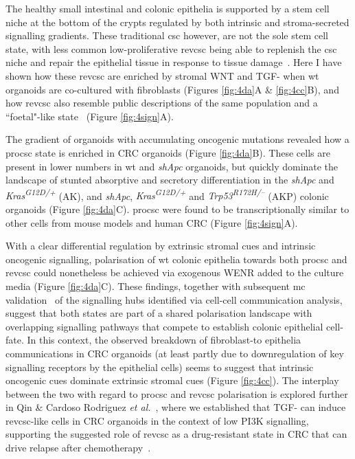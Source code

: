 The healthy small intestinal and colonic epithelia is supported by a stem cell niche at the bottom of the crypts regulated by both intrinsic and stroma-secreted signalling gradients. These traditional \acrfull{csc} however, are not the sole stem cell state, with less common low-proliferative \acrfull{revcsc} being able to replenish the \acrshort{csc} niche and repair the epithelial tissue in response to tissue damage~\cite{ayyaz_single-cell_2019}. Here I have shown how these \acrshort{revcsc} are enriched by stromal WNT and TGF-\textbeta\hspace{0.1cm} when \acrshort{wt} organoids are co-cultured with fibroblasts (Figures \ref{fig:4da}A \& \ref{fig:4cc}B), and how \acrshort{revcsc} also resemble public descriptions of the same population and a “foetal"-like state~\cite{mustata_identification_2013} (Figure \ref{fig:4sign}A).

The gradient of organoids with accumulating oncogenic mutations revealed how a \acrfull{procsc} state is enriched in CRC organoids (Figure \ref{fig:4da}B). These cells are present in lower numbers in \acrshort{wt} and \textit{shApc} organoids, but quickly dominate the landscape of stunted absorptive and secretory differentiation in the \textit{shApc} and \textit{Kras\textsuperscript{G12D/+}} (AK), and \textit{shApc}, \textit{Kras\textsuperscript{G12D/+}} and \textit{Trp53\textsuperscript{R172H/–}} (AKP) colonic organoids (Figure \ref{fig:4da}C). \acrshort{procsc} were found to be transcriptionally similar to other cells from mouse models and human CRC (Figure \ref{fig:4sign}A).

With a clear differential regulation by extrinsic stromal cues and intrinsic oncogenic signalling, polarisation of \acrshort{wt} colonic epithelia towards both \acrshort{procsc} and \acrshort{revcsc} could nonetheless be achieved via exogenous WENR added to the culture media (Figure \ref{fig:4da}C). These findings, together with subsequent \acrshort{mc} validation~\cite{cardoso_rodriguez_single-cell_2023} of the signalling hubs identified via cell-cell communication analysis, suggest that both states are part of a shared polarisation landscape with overlapping signalling pathways that compete to establish colonic epithelial cell-fate.
In this context, the observed breakdown of fibroblast-to epithelia communications in CRC organoids (at least partly due to downregulation of key signalling receptors by the epithelial cells) seems to suggest that intrinsic oncogenic cues dominate extrinsic stromal cues (Figure \ref{fig:4cc}). The interplay between the two with regard to \acrshort{procsc} and \acrshort{revcsc} polarisation is explored further in Qin \& Cardoso Rodriguez \emph{et al.}~\cite{cardoso_rodriguez_single-cell_2023}, where we established that TGF-\textbeta\hspace{0.1cm} can induce \acrshort{revcsc}-like cells in CRC organoids in the context of low PI3K signalling, supporting the suggested role of \acrshort{revcsc} as a drug-resistant state in CRC that can drive relapse after chemotherapy~\cite{alvarez-varela_mex3a_2022, zapatero_trellis_2023}.

